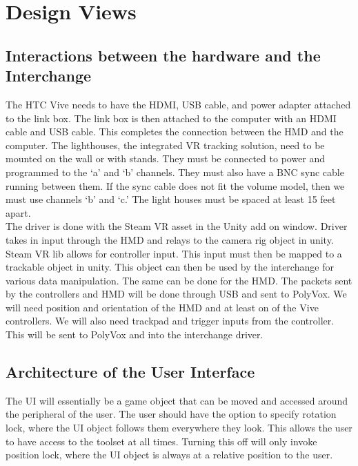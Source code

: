 \documentclass[onecolumn, draftclsnofoot,10pt, compsoc]{IEEEtran}
\begin{document}
\section{Design Views}

\subsection{Interactions between the hardware and the Interchange}
The HTC Vive needs to have the HDMI, USB cable, and power adapter attached to the link box. The link box is then attached to the computer with an HDMI cable and USB cable. This completes the connection between the HMD and the computer.
The lighthouses, the integrated VR tracking solution, need to be mounted on the wall or with stands. They must be connected to power and programmed to the ‘a’ and ‘b’ channels. They must also have a BNC sync cable running between them. If the sync cable does not fit the volume model, then we must use channels ‘b’ and ‘c.’ The light houses must be spaced at least 15 feet apart. \\

The driver is done with the Steam VR asset in the Unity add on window. Driver takes in input through the HMD and relays to the camera rig object in unity. Steam VR lib allows for controller input. This input must then be mapped to a trackable object in unity. This object can then be used by the interchange for various data manipulation. The same can be done for the HMD. 
The packets sent by the controllers and HMD will be done through USB and sent to PolyVox. We will need position and orientation of the HMD and at least on of the Vive controllers. We will also need trackpad and trigger inputs from the controller. This will be sent to PolyVox and into the interchange driver.\\


\subsection{Architecture of the User Interface}
The UI will essentially be a game object that can be moved and accessed around the peripheral of the user. The user should have the option to specify rotation lock, where the UI object follows them everywhere they look. This allows the user to have access to the toolset at all times. Turning this off will only invoke position lock, where the UI object is always at a relative position to the user. \\
\end{document}
